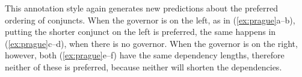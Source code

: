 \vspace{0.5\treeheight}

This annotation style again generates new predictions about the preferred ordering of conjuncts. When the governor is on the left, as in (\ref{ex:prague}a--b), putting the shorter conjunct on the left is preferred, the same happens in (\ref{ex:prague}c--d), when there is no governor. When the governor is on the right, however, both (\ref{ex:prague}e--f) have the same dependency lengths, therefore neither of these is preferred, because neither will shorten the dependencies.